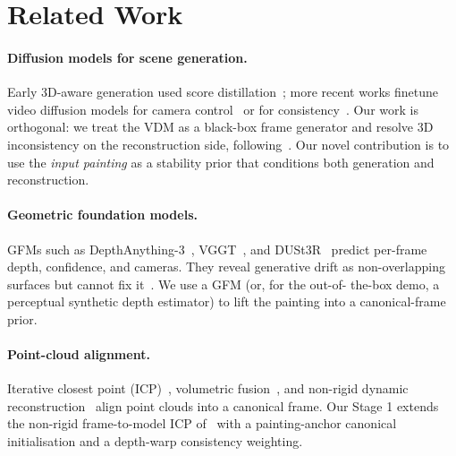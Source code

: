 \documentclass[10pt,twocolumn,letterpaper]{article}
\begin{document}
\section{Related Work}
\label{sec:related}

\paragraph{Diffusion models for scene generation.}
Early 3D-aware generation used score distillation~\cite{dreamfusion,magic3d};
more recent works finetune video diffusion models for camera
control~\cite{viewcrafter,gen3c,seva,cameractrl} or for
consistency~\cite{consisti2v}. Our work is orthogonal: we treat the VDM as a
black-box frame generator and resolve 3D inconsistency on the reconstruction
side, following~\cite{hoellein2026worldreconstruction,worldexplorer}. Our
novel contribution is to use the \emph{input painting} as a stability prior
that conditions both generation and reconstruction.

\paragraph{Geometric foundation models.}
GFMs such as DepthAnything-3~\cite{da3}, VGGT~\cite{vggt}, and
DUSt3R~\cite{dust3r} predict per-frame depth, confidence, and cameras. They
reveal generative drift as non-overlapping surfaces but cannot fix
it~\cite{hoellein2026worldreconstruction}. We use a GFM (or, for the out-of-
the-box demo, a perceptual synthetic depth estimator) to lift the painting
into a canonical-frame prior.

\paragraph{Point-cloud alignment.}
Iterative closest point (ICP)~\cite{icp,coloredicp}, volumetric
fusion~\cite{kinectfusion}, and non-rigid dynamic
reconstruction~\cite{dynamicfusion} align point clouds into a canonical frame.
Our Stage 1 extends the non-rigid frame-to-model ICP
of~\cite{hoellein2026worldreconstruction} with a painting-anchor canonical
initialisation and a depth-warp consistency weighting.
\end{document}
